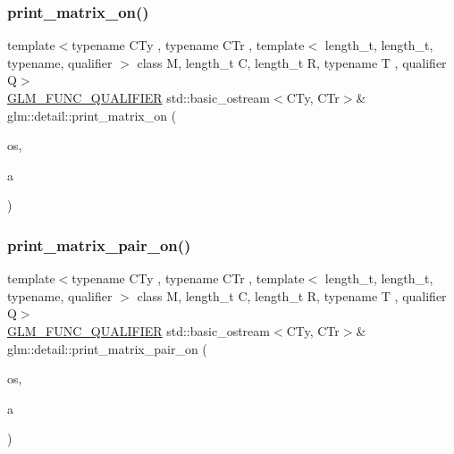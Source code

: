 \subsubsection{\texorpdfstring{print\+\_\+matrix\+\_\+on()}{print\_matrix\_on()}}
{\footnotesize\ttfamily template$<$typename C\+Ty , typename C\+Tr , template$<$ length\+\_\+t, length\+\_\+t, typename, qualifier $>$ class M, length\+\_\+t C, length\+\_\+t R, typename T , qualifier Q$>$ \\
\mbox{\hyperlink{setup_8hpp_a33fdea6f91c5f834105f7415e2a64407}{G\+L\+M\+\_\+\+F\+U\+N\+C\+\_\+\+Q\+U\+A\+L\+I\+F\+I\+ER}} std\+::basic\+\_\+ostream$<$C\+Ty, C\+Tr$>$\& glm\+::detail\+::print\+\_\+matrix\+\_\+on (\begin{DoxyParamCaption}\item[{std\+::basic\+\_\+ostream$<$ C\+Ty, C\+Tr $>$ \&}]{os,  }\item[{M$<$ C, R, T, Q $>$ const \&}]{a }\end{DoxyParamCaption})}

\mbox{\label{namespaceglm_1_1detail_a5b82ceb67c3495960b07267d105170c5}} 
\subsubsection{\texorpdfstring{print\+\_\+matrix\+\_\+pair\+\_\+on()}{print\_matrix\_pair\_on()}}
{\footnotesize\ttfamily template$<$typename C\+Ty , typename C\+Tr , template$<$ length\+\_\+t, length\+\_\+t, typename, qualifier $>$ class M, length\+\_\+t C, length\+\_\+t R, typename T , qualifier Q$>$ \\
\mbox{\hyperlink{setup_8hpp_a33fdea6f91c5f834105f7415e2a64407}{G\+L\+M\+\_\+\+F\+U\+N\+C\+\_\+\+Q\+U\+A\+L\+I\+F\+I\+ER}} std\+::basic\+\_\+ostream$<$C\+Ty, C\+Tr$>$\& glm\+::detail\+::print\+\_\+matrix\+\_\+pair\+\_\+on (\begin{DoxyParamCaption}\item[{std\+::basic\+\_\+ostream$<$ C\+Ty, C\+Tr $>$ \&}]{os,  }\item[{std\+::pair$<$ M$<$ C, R, T, Q $>$ const, M$<$ C, R, T, Q $>$ const $>$ const \&}]{a }\end{DoxyParamCaption})}

\mbox{\label{namespaceglm_1_1detail_a9d760c8d2e4e01ac441fcbba7d387055}} 
